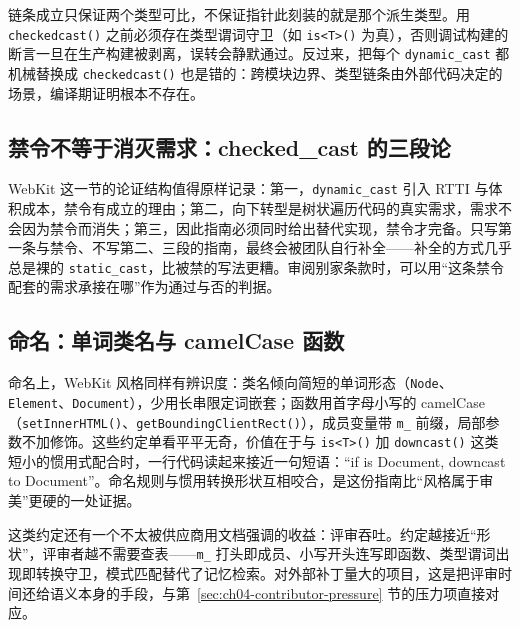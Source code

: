 \documentclass[12pt,a4paper,fontset=fandol]{ctexbook}
\newcommand{\Fn}[1]{\texttt{#1()}}
\newcommand{\Tp}[1]{\texttt{#1}}
\newcommand{\Bk}{\discretionary{}{}{}}
\begin{document}
\begin{warning}[title={checked\_cast 不是类型系统的替身}]
链条成立只保证两个类型可比，不保证指针此刻装的就是那个派生类型。用 \Fn{checked{\Bk}cast} 之前必须存在类型谓词守卫（如 \Tp{is}\Tp{<T>()} 为真），否则调试构建的断言一旦在生产构建被剥离，误转会静默通过。反过来，把每个 \Tp{dynamic\_\allowbreak cast} 都机械替换成 \Fn{checked{\Bk}cast} 也是错的：跨模块边界、类型链条由外部代码决定的场景，编译期证明根本不存在。
\end{warning}

\subsection{禁令不等于消灭需求：checked\_cast 的三段论}
\label{sec:ch04-checkedcast-syllogism}

\begin{guideline}[title={一条禁令应有的三段论结构}]
WebKit 这一节的论证结构值得原样记录：第一，\Tp{dynamic\_\allowbreak cast} 引入 RTTI 与体积成本，禁令有成立的理由；第二，向下转型是树状遍历代码的真实需求，需求不会因为禁令而消失；第三，因此指南必须同时给出替代实现，禁令才完备。只写第一条与禁令、不写第二、三段的指南，最终会被团队自行补全——补全的方式几乎总是裸的 \Tp{static\_cast}，比被禁的写法更糟。审阅别家条款时，可以用``这条禁令配套的需求承接在哪''作为通过与否的判据。
\end{guideline}

\subsection{命名：单词类名与 camelCase 函数}
\label{sec:ch04-webkit-naming}

命名上，WebKit 风格同样有辨识度：类名倾向简短的单词形态（\Tp{Node}、\Tp{Element}、\Tp{Document}），少用长串限定词嵌套；函数用首字母小写的 camelCase（\Fn{setInnerHTML}、\Fn{getBoundingClientRect}），成员变量带 \Tp{m\_} 前缀，局部参数不加修饰。这些约定单看平平无奇，价值在于与 \Tp{is}\Tp{<T>()} 加 \Fn{downcast{\Bk}} 这类短小的惯用式配合时，一行代码读起来接近一句短语：``if is Document, downcast to Document''。命名规则与惯用转换形状互相咬合，是这份指南比``风格属于审美''更硬的一处证据。

这类约定还有一个不太被供应商用文档强调的收益：评审吞吐。约定越接近``形状''，评审者越不需要查表——\Tp{m\_} 打头即成员、小写开头连写即函数、类型谓词出现即转换守卫，模式匹配替代了记忆检索。对外部补丁量大的项目，这是把评审时间还给语义本身的手段，与第~\ref{sec:ch04-contributor-pressure} 节的压力项直接对应。
\end{document}
